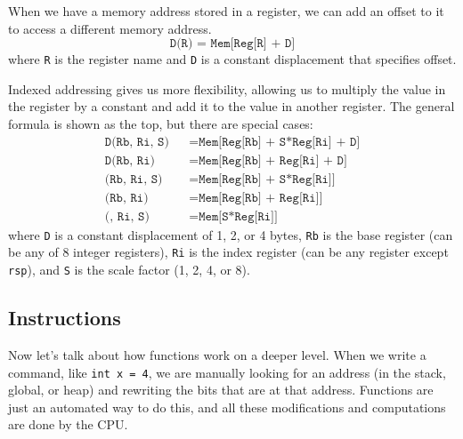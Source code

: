   \begin{definition}
    When we have a memory address stored in a register, we can add an offset to it to access a different memory address. 
    \begin{equation}
      \texttt{D(R) = Mem[Reg[R] + D]}
    \end{equation}
    where \texttt{R} is the register name and \texttt{D} is a constant displacement that specifies offset. 
  \end{definition}

  \begin{definition}
    Indexed addressing gives us more flexibility, allowing us to multiply the value in the register by a constant and add it to the value in another register. The general formula is shown as the top, but there are special cases: 
    \begin{align*}
      \texttt{D(Rb, Ri, S)} && = \texttt{Mem[Reg[Rb] + S*Reg[Ri] + D]} \\ 
      \texttt{D(Rb, Ri)} && = \texttt{Mem[Reg[Rb] + Reg[Ri] + D]} \\
      \texttt{(Rb, Ri, S)} && = \texttt{Mem[Reg[Rb] + S*Reg[Ri]]} \\ 
      \texttt{(Rb, Ri)} && = \texttt{Mem[Reg[Rb] + Reg[Ri]]} \\
      \texttt{(, Ri, S)} && = \texttt{Mem[S*Reg[Ri]]} 
    \end{align*}
    where \texttt{D} is a constant displacement of 1, 2, or 4 bytes, \texttt{Rb} is the base register (can be any of 8 integer registers), \texttt{Ri} is the index register (can be any register except \texttt{rsp}), and \texttt{S} is the scale factor (1, 2, 4, or 8). 
  \end{definition}

\subsection{Instructions}

    Now let's talk about how functions work on a deeper level. When we write a command, like \texttt{int x = 4}, we are manually looking for an address (in the stack, global, or heap) and rewriting the bits that are at that address. Functions are just an automated way to do this, and all these modifications and computations are done by the CPU. 

